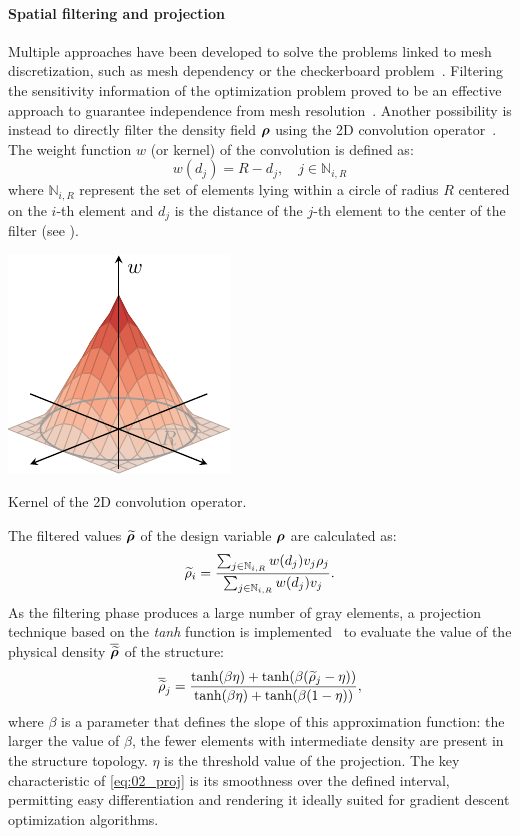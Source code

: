 \paragraph{Spatial filtering and projection} 
Multiple approaches have been developed to solve the problems linked to mesh discretization, such as mesh dependency or the checkerboard problem~. Filtering the sensitivity information of the optimization problem proved to be an effective approach to guarantee independence from mesh resolution~. Another possibility is instead to directly filter the density field $\bm{\rho}$ using the 2D convolution operator~. The weight function $w$ (or kernel) of the convolution is defined as:
\begin{equation}
    w(d_j) = R - d_j, \quad j \in \mathbb{N}_{i,R}
\end{equation} 
where $\mathbb{N}_{i,R}$ represent the set of elements lying within a circle of radius $R$ centered on the $i$-th element and $d_j$ is the distance of the $j$-th element to the center of the filter (see ).
\begin{marginfigure}
    \centering
    \includegraphics{figures/02_literature/02_circ_filter/filt_cir.pdf}
    \caption{Kernel of the 2D convolution operator.}
    \label{fig:02_ker}
\end{marginfigure} 
The filtered values $\bm{\widetilde{\rho}}$ of the design variable $\bm{\rho}$  are calculated as:
\begin{equation}
    \widetilde{\rho}_i = \frac{\sum_{j \in \mathbb{N}_{i,R}} w(d_j)v_j\rho_j}{\sum_{j \in \mathbb{N}_{i,R}} w(d_j)v_j}.
    \label{eq:02_rhofil}
\end{equation}
As the filtering phase produces a large number of gray elements, a projection technique based on the \textit{tanh} function is implemented~ to evaluate the value of the physical density $\bm{\overline{\widetilde{\rho}}}$  of the structure:
\begin{equation}
    \overline{\widetilde{\rho}}_j = \frac{\tanh(\beta\eta)+\tanh(\beta(\widetilde{\rho}_j - \eta))}{\tanh(\beta\eta)+\tanh(\beta(1 - \eta))},
    \label{eq:02_proj}
\end{equation}
where $\beta$ is a parameter that defines the slope of this approximation function: the larger the value of $\beta$, the fewer elements with intermediate density are present in the structure topology. $\eta$ is the threshold value of the projection. The key characteristic of \eqref{eq:02_proj} is its smoothness over the defined interval, permitting easy differentiation and rendering it ideally suited for gradient descent optimization algorithms.

